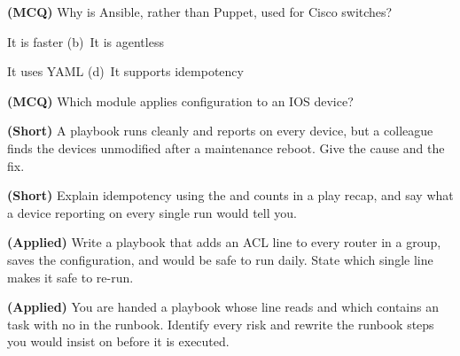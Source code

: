 \begin{reviewq}
  \item \textbf{(MCQ)} Why is Ansible, rather than Puppet, used for Cisco
        switches?
        \begin{tight}
          \item[(a)] It is faster \quad (b)~It is agentless
          \item[(c)] It uses YAML \quad (d)~It supports idempotency
        \end{tight}
  \item \textbf{(MCQ)} Which module applies configuration to an IOS device?
        \begin{tight}
          \item[(a)] 
          \item[(b)] 
          \item[(c)] 
          \item[(d)] 
        \end{tight}
  \item \textbf{(Short)} A playbook runs cleanly and reports  on
        every device, but a colleague finds the devices unmodified after a
        maintenance reboot. Give the cause and the fix.
  \item \textbf{(Short)} Explain idempotency using the  and 
        counts in a play recap, and say what a device reporting  on
        every single run would tell you.
  \item \textbf{(Applied)} Write a playbook that adds an ACL line to every router
        in a group, saves the configuration, and would be safe to run daily.
        State which single line makes it safe to re-run.
  \item \textbf{(Applied)} You are handed a playbook whose  line reads
         and which contains an  task with no
         in the runbook. Identify every risk and rewrite the runbook
        steps you would insist on before it is executed.
\end{reviewq}
